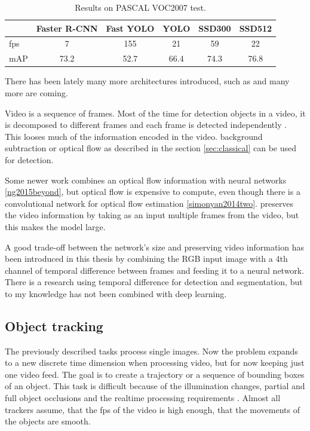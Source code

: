 \documentclass[a4paper,12pt,titlepage]{article}
\numberwithin{figure}{section}
\begin{document}
\begin{table}
\centering
\begin{tabular}{|l|c|c|c|c|c|}
  \hline
  &Faster R-CNN & Fast YOLO & YOLO & SSD300 & SSD512 \\
  \hline
  fps & 7 & 155 & 21 & 59 & 22\\
  \hline
  mAP & 73.2 & 52.7 & 66.4 & 74.3 & 76.8\\
  \hline
\end{tabular}
\caption{Results on PASCAL VOC2007 test.}
\end{table}

There has been lately many more architectures introduced, such as \cite{lin2017focal, li2017fssd, dai2016r} and many more are coming.

Video is a sequence of frames. Most of the time for detection objects in a video, it is decomposed to different frames  and each frame is detected independently \cite{sudowe2011efficient}. This looses much of the information  encoded in the video. background subtraction \cite{gonzalez2012digital} or optical flow \cite{naoya1990optical} as described in the section \ref{sec:classical} can be used for detection. 

Some newer work combines an optical flow information with neural networks \ref{ng2015beyond}, but optical flow is expensive to compute, even though there is a convolutional network for optical flow estimation \ref{simonyan2014two}. \cite{karpathy2014large} preserves the video information by taking as an input multiple frames from the video, but this makes the model large. 

A good trade-off between the network's size and preserving video information has been introduced in this thesis by combining the RGB input image with a 4th channel of temporal difference between frames and feeding it to a neural network. There is a research \cite{bayona2010stationary, koprinska2001temporal} using temporal difference for detection and segmentation, but to my knowledge has not been combined with deep learning.


\subsection{Object tracking}

The previously described tasks process single images. Now the problem expands to a new discrete time dimension when processing video, but for now keeping just one video feed. The goal is to create a trajectory or a sequence of bounding boxes of an object. This task is difficult because of the illumination changes, partial and full object occlusions and the realtime processing requirements \cite{yilmaz2006object}. Almost all trackers assume, that the fps of the video is high enough, that the movements of the objects are smooth. 
\end{document}

